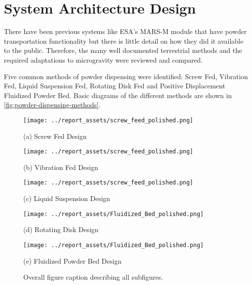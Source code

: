 \section{System Architecture Design}
There have been previous systems like ESA's MARS-M module that have powder transportation functionality but there is little detail on how they did it available to the public. Therefore, the many well documented terrestrial methods and the required adaptations to microgravity were reviewed and compared.

Five common methods of powder dispensing were identified: Screw Fed, Vibration Fed, Liquid Suspension Fed, Rotating Disk Fed and Positive Displacement Fluidized Powder Bed. Basic diagrams of the different methods are shown in \autoref{fig:powder-dispensing-methods}. 
\begin{figure}[htbp]
    \centering

    \begin{minipage}{0.3\textwidth}
        \centering
        \texttt{[image: ../report\_assets/screw\_feed\_polished.png]}
        \caption*{(a) Screw Fed Design}
    \end{minipage}
    \hfill
    \begin{minipage}{0.3\textwidth}
        \centering
        \texttt{[image: ../report\_assets/screw\_feed\_polished.png]}
        \caption*{(b) Vibration Fed Design}
    \end{minipage}
    \hfill
    \begin{minipage}{0.3\textwidth}
        \centering
        \texttt{[image: ../report\_assets/screw\_feed\_polished.png]}
        \caption*{(c) Liquid Suspension Design}
    \end{minipage}

    \vspace{0.5cm} %

    \begin{minipage}{0.4\textwidth}
        \centering
        \texttt{[image: ../report\_assets/Fluidized\_Bed\_polished.png]}
        \caption*{(d) Rotating Disk Design}
    \end{minipage}
    \hspace{0.1\textwidth}
    \begin{minipage}{0.4\textwidth}
        \centering
        \texttt{[image: ../report\_assets/Fluidized\_Bed\_polished.png]}
        \caption*{(e) Fluidized Powder Bed Design}
    \end{minipage}

    \caption{Overall figure caption describing all subfigures.}
    \label{fig:powder-dispensing-methods}
\end{figure}

